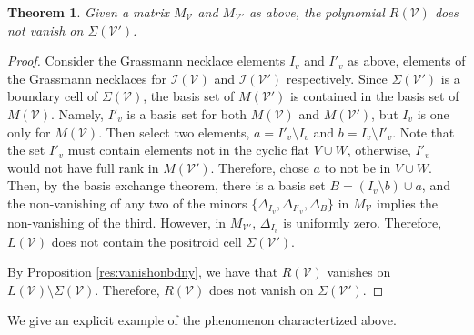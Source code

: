 \documentclass[11pt]{article}
\newcommand{\cV}{\mathcal{V}}
\newcommand{\cI}{\mathcal{I}}
\newtheorem{thm}{Theorem}[section]
\theoremstyle{remark}
\theoremstyle{definition}
\begin{document}
\begin{thm}
Given a matrix $M_{\cV}$ and $M_{\cV'}$ as above, the polynomial $R(\cV)$ does not vanish on $\Sigma(\cV')$. 
\end{thm} 

\begin{proof}
Consider the Grassmann necklace elements $I_v$ and $I'_v$ as above, elements of the Grassmann necklaces for $\cI(\cV)$ and $\cI(\cV')$ respectively. Since $\Sigma(\cV')$ is a boundary cell of $\Sigma(\cV)$, the basis set of $M(\cV')$ is contained in the basis set of $M(\cV)$. Namely, $I'_v$ is a basis set for both $M(\cV)$ and $M(\cV')$, but $I_v$ is one only for $M(\cV)$. Then select two elements, $a = I'_v \setminus I_v$ and $b = I_v \setminus I'_v$. Note that the set $I'_v$ must contain elements not in the cyclic flat $V \cup W$, otherwise, $I'_v$ would not have full rank in $M(\cV')$. Therefore, chose $a$ to not be in $V \cup W$. Then, by the basis exchange theorem, there is a basis set $B = (I_v \setminus b)\cup a$, and the non-vanishing of any two of the minors $\{\Delta_{I_v}, \Delta_{I'_v}, \Delta_{B}\}$ in $M_\cV$ implies the non-vanishing of the third. However, in $M_{\cV'}$, $\Delta_{I_v}$ is uniformly zero. Therefore, $L(\cV)$ does not contain the positroid cell $\Sigma(\cV')$.

By Proposition \ref{res:vanishonbdny}, we have that $R(\cV)$ vanishes on $L(\cV) \setminus \Sigma(\cV)$. Therefore, $R(\cV)$ does not vanish on $\Sigma(\cV')$. 
\end{proof}

We give an explicit example of the phenomenon charactertized above. 
\end{document}
